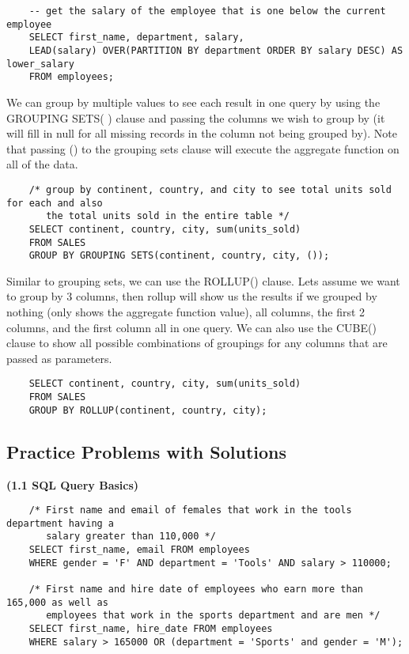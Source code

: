 \documentclass[11pt, a4paper]{article}
\begin{document}
\begin{spacing}{1.1}
	\begin{lstlisting}
	-- get the salary of the employee that is one below the current employee
	SELECT first_name, department, salary, 
	LEAD(salary) OVER(PARTITION BY department ORDER BY salary DESC) AS lower_salary
	FROM employees;	\end{lstlisting} \vspace*{1mm}
	We can group by multiple values to see each result in one query by using the GROUPING SETS( ) clause and passing the columns we wish to group by (it will fill in null for all missing records in the column not being grouped by). Note that passing () to the grouping sets clause will execute the aggregate function on all of the data. \newpage
	\begin{lstlisting}
	/* group by continent, country, and city to see total units sold for each and also
	   the total units sold in the entire table */
	SELECT continent, country, city, sum(units_sold)
	FROM SALES
	GROUP BY GROUPING SETS(continent, country, city, ()); \end{lstlisting} \vspace*{1mm}
	Similar to grouping sets, we can use the ROLLUP() clause. Lets assume we want to group by 3 columns, then rollup will show us the results if we grouped by nothing (only shows the aggregate function value), all columns, the first 2 columns, and the first column all in one query. We can also use the CUBE() clause to show all possible combinations of groupings for any columns that are passed as parameters.
	\begin{lstlisting}
	SELECT continent, country, city, sum(units_sold)
	FROM SALES
	GROUP BY ROLLUP(continent, country, city); \end{lstlisting} \vspace*{5mm}
	
	\subsection{Practice Problems with Solutions}
	\large \textbf{(1.1 SQL Query Basics)} \normalsize
	\begin{lstlisting}
	/* First name and email of females that work in the tools department having a 
	   salary greater than 110,000 */
	SELECT first_name, email FROM employees
	WHERE gender = 'F' AND department = 'Tools' AND salary > 110000;
	
	/* First name and hire date of employees who earn more than 165,000 as well as 
	   employees that work in the sports department and are men */
	SELECT first_name, hire_date FROM employees
	WHERE salary > 165000 OR (department = 'Sports' and gender = 'M');
	

\end{lstlisting}
\end{spacing}
\end{document}
